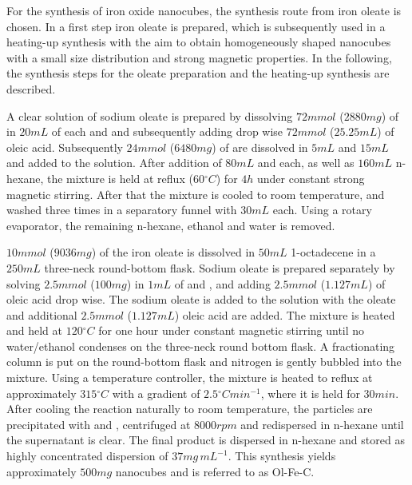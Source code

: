 \documentclass[\main/dresen_thesis.tex]{subfiles}
\begin{document}
  \label{sec:colloidalCrystals:nanoparticle:synthesisOleatesAcAc}
  For the synthesis of iron oxide nanocubes, the synthesis route from iron oleate is chosen.
  In a first step iron oleate is prepared, which is subsequently used in a heating-up synthesis with the aim to obtain homogeneously shaped nanocubes with a small size distribution and strong magnetic properties.
  In the following, the synthesis steps for the oleate preparation and the heating-up synthesis are described.

    A clear solution of sodium oleate is prepared by dissolving $72 \unit{mmol}$ ($2880 \unit{mg}$) of  in $20 \unit{mL}$ of each  and  and subsequently adding drop wise $72 \unit{mmol}$ ($25.25 \unit{mL}$) of oleic acid.
    Subsequently $24 \unit{mmol}$ ($6480 \unit{mg}$) of  are dissolved in $5 \unit{mL}$  and $15 \unit{mL}$  and added to the solution.
    After addition of $80 \unit{mL}$  and  each, as well as $160 \unit{mL}$ n-hexane, the mixture is held at reflux ($60 \unit{^\circ C}$) for $4 \unit{h}$ under constant strong magnetic stirring.
    After that the mixture is cooled to room temperature, and washed three times in a separatory funnel with $30 \unit{mL}$  each.
    Using a rotary evaporator, the remaining n-hexane, ethanol and water is removed.

    $10 \unit{mmol}$ ($9036 \unit{mg}$) of the iron oleate is dissolved in $50 \unit{mL}$ 1-octadecene in a $250 \unit{mL}$ three-neck round-bottom flask.
    Sodium oleate is prepared separately by solving $2.5 \unit{mmol}$ ($100 \unit{mg}$)  in $1 \unit{mL}$ of  and , and adding $2.5 \unit{mmol}$ ($1.127 \unit{mL}$) of oleic acid drop wise.
    The sodium oleate is added to the solution with the oleate and additional $2.5 \unit{mmol}$ ($1.127 \unit{mL}$) oleic acid are added.
    The mixture is heated and held at $120 \unit{^\circ C}$ for one hour under constant magnetic stirring until no water/ethanol condenses on the three-neck round bottom flask.
    A fractionating column is put on the round-bottom flask and nitrogen is gently bubbled into the mixture.
    Using a temperature controller, the mixture is heated to reflux at approximately $315 \unit{^\circ C}$ with a gradient of $2.5 \unit{^\circ C min^{-1}}$, where it is held for $30 \unit{min}$.
    After cooling the reaction naturally to room temperature, the particles are precipitated with  and , centrifuged at $8000 \unit{rpm}$ and redispersed in n-hexane until the supernatant is clear.
    The final product is dispersed in n-hexane and stored as highly concentrated dispersion of $37 \unit{mg \, mL^{-1}}$.
    This synthesis yields approximately $500 \unit{mg}$ nanocubes and is referred to as Ol-Fe-C.
\end{document}

